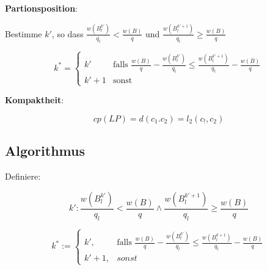       \par \textbf{Partionsposition}:

      \indent \par Bestimme $k'$, so dass $\frac{w(B_{l}^{k'})}{q_l} < \frac{w(B)}{q}$ und $\frac{w(B_{l}^{k' + 1})}{q_l} \geq \frac{w(B)}{q}$

      \begin{equation*}
        k^* = 
          \begin{cases}
            k' & \text{falls } \frac{w(B)}{q} - \frac{w(B_{l}^{k'})}{q_l} \leq \frac{w(B_{l}^{k' + 1})}{q_l} - \frac{w(B)}{q} \\
            k' + 1 &\text{sonst}
          \end{cases}
      \end{equation*}
    
      \par \textbf{Kompaktheit}:

      \begin{equation*}
        cp(LP) = d(c_1. c_2) = l_2(c_!, c_2)
      \end{equation*}


    \subsection{Algorithmus} %
    \label{sub:algorithmus}

      \par Definiere:

      $$k': \frac{w(B_l^{k'})}{q_l} < \frac{w(B)}{q} \wedge \frac{w(B_l^{k' + 1})}{q_l} \geq \frac{w(B)}{q}$$

      $$
        k^*:= \begin{cases}
          k', & \text{falls } \frac{w(B)}{q} - \frac{w(B_l^{k'})}{q_l} \leq \frac{w(B_l^{k+1})}{q_l} - \frac{w(B)}{q} \\
          k'+1, & sonst
        \end{cases}
      $$


